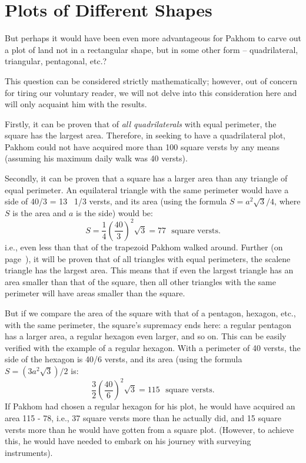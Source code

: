 \section{Plots of Different Shapes}
\label{sec-12.5}

But perhaps it would have been even more advantageous for Pakhom to carve out a plot of land not in a rectangular shape, but in some other form -- quadrilateral, triangular, pentagonal, etc.?

This question can be considered strictly mathematically; however, out of concern for tiring our voluntary reader, we will not delve into this consideration here and will only acquaint him with the results.

Firstly, it can be proven that of \emph{all quadrilaterals} with equal perimeter, the square has the largest area. Therefore, in seeking to have a quadrilateral plot, Pakhom could not have acquired more than 100 square versts by any means (assuming his maximum daily walk was 40 versts).

Secondly, it can be proven that a square has a larger area than any triangle of equal perimeter. An equilateral triangle with the same perimeter would have a side of 40/3 = 13 \, 1/3 versts, and its area (using the formula \( S = a^{2} \sqrt{3}/4 \), where \( S \) is the area and \( a \) is the side) would be:
\begin{equation*}%
 S = \frac{1}{4} \left(\frac{40}{3}\right)^{2} \sqrt{3} = 77 \,\, \text{ square versts}.
 \end{equation*}
i.e., even less than that of the trapezoid Pakhom walked around. Further (on page~\pageref{sec-10.2}), it will be proven that of all triangles with equal perimeters, the scalene triangle has the largest area. This means that if even the largest triangle has an area smaller than that of the square, then all other triangles with the same perimeter will have areas smaller than the square.

But if we compare the area of the square with that of a pentagon, hexagon, etc., with the same perimeter, the square's supremacy ends here: a regular pentagon has a larger area, a regular hexagon even larger, and so on. This can be easily verified with the example of a regular hexagon. With a perimeter of 40 versts, the side of the hexagon is 40/6 versts, and its area (using the formula \( S = (3a^{2}\sqrt{3})/2 \) is:
\begin{equation*}%
 \frac{3}{2} \left(\frac{40}{6}\right)^{2} \sqrt{3} = 115 \,\, \text{ square versts}.
 \end{equation*}
If Pakhom had chosen a regular hexagon for his plot, he would have acquired an area 115 - 78, i.e., 37 square versts more than he actually did, and 15 square versts more than he would have gotten from a square plot. (However, to achieve this, he would have needed to embark on his journey with surveying instruments).




